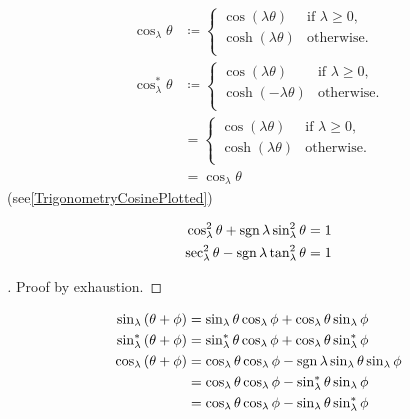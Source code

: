\documentclass[../main.tex]{subfiles}
\begin{document}
\begin{example}\label{M:Trigonometry:Cosine}
\begin{align*}
\cos_\lambda{\theta}
&\coloneqq
\begin{cases}
\cos\left(\lambda\theta\right)&\text{if $\lambda\geq0$,}\\
\cosh\left(\lambda\theta\right)&\text{otherwise.}\\
\end{cases}\\
\cos_\lambda^\ast{\theta}
&\coloneqq
\begin{cases}
\cos\left(\lambda\theta\right)&\text{if $\lambda\geq0$,}\\
\cosh\left(-\lambda\theta\right)&\text{otherwise.}\\
\end{cases}\\
&=\begin{cases}
\cos\left(\lambda\theta\right)&\text{if $\lambda\geq0$,}\\
\cosh\left(\lambda\theta\right)&\text{otherwise.}\\
\end{cases}\\
&=\cos_\lambda{\theta}
\end{align*}
(see\cref{TrigonometryCosinePlotted})
\end{example}
\begin{theorem}\label{M:Trigonometry:Pythagorean}
\begin{align*}
\cos_\lambda^2{\theta}+\operatorname{sgn}{\lambda}\sin_\lambda^2{\theta}&=1\\
\sec_\lambda^2{\theta}-\operatorname{sgn}{\lambda}\tan_\lambda^2{\theta}&=1\\
\end{align*}
\end{theorem}
\begin{proof}[]
Proof by exhaustion.
\end{proof}
\begin{proposition}\label{M:Trigonometry:Sum}
\begin{align*}
\sin_\lambda\left(\theta+\phi\right)
&=\sin_\lambda{\theta}\cos_\lambda{\phi}+\cos_\lambda{\theta}\sin_\lambda{\phi}\\
\sin_\lambda^\ast\left(\theta+\phi\right)
&=\sin_\lambda^\ast{\theta}\cos_\lambda{\phi}+\cos_\lambda{\theta}\sin_\lambda^\ast{\phi}\\
\cos_\lambda\left(\theta+\phi\right)
&=\cos_\lambda{\theta}\cos_\lambda{\phi}-\operatorname{sgn}{\lambda}\sin_\lambda{\theta}\sin_\lambda{\phi}\\
&=\cos_\lambda{\theta}\cos_\lambda{\phi}-\sin_\lambda^\ast{\theta}\sin_\lambda{\phi}\\
&=\cos_\lambda{\theta}\cos_\lambda{\phi}-\sin_\lambda{\theta}\sin_\lambda^\ast{\phi}
\end{align*}
\end{proposition}
\end{document}
